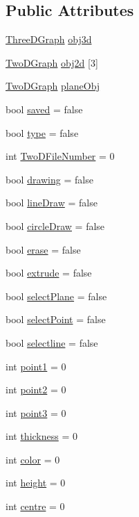 \subsection*{Public Attributes}
\begin{DoxyCompactItemize}
\item 
\hyperlink{classThreeDGraph}{Three\+D\+Graph} \hyperlink{classInteractive__editor_a2620ec3a4c9f18e9cd873e2a90c1167d}{obj3d}
\item 
\hyperlink{classTwoDGraph}{Two\+D\+Graph} \hyperlink{classInteractive__editor_a61dd4318434d640cc5191e038b66a407}{obj2d} \mbox{[}3\mbox{]}
\item 
\hyperlink{classTwoDGraph}{Two\+D\+Graph} \hyperlink{classInteractive__editor_aed0bc7a1d2cafae39f3fbf2eb119649c}{plane\+Obj}
\item 
bool \hyperlink{classInteractive__editor_a2e6cd28cc09c6250bb5aa720acfc16a4}{saved} = false
\item 
bool \hyperlink{classInteractive__editor_a93c2f2041e432c8047d51942345cc3f9}{type} = false
\item 
int \hyperlink{classInteractive__editor_a016e5e8e9a124977ab6048c90980be97}{Two\+D\+File\+Number} = 0
\item 
bool \hyperlink{classInteractive__editor_ace62b483a0866c64212ee0c641445c7a}{drawing} = false
\item 
bool \hyperlink{classInteractive__editor_aa0de8abac09ce2259252fba6c1958e83}{line\+Draw} = false
\item 
bool \hyperlink{classInteractive__editor_a1d7855fd44f17fb78dbb86e8b7962758}{circle\+Draw} = false
\item 
bool \hyperlink{classInteractive__editor_ac2f2f1dfb6c21585d4ed5ed043e41b25}{erase} = false
\item 
bool \hyperlink{classInteractive__editor_a3e4db48e715e92969ba3ec52ab14ce8d}{extrude} = false
\item 
bool \hyperlink{classInteractive__editor_a9da61abe038ee33f9d15ef4a028dc8ab}{select\+Plane} = false
\item 
bool \hyperlink{classInteractive__editor_ab0f07759c3ff1bcfe45d0c285abe29b5}{select\+Point} = false
\item 
bool \hyperlink{classInteractive__editor_ad2e77097ff1ba602c3cdca2905febea7}{selectline} = false
\item 
int \hyperlink{classInteractive__editor_a07fe2897bcad8eabf5b98e01a162b2a1}{point1} = 0
\item 
int \hyperlink{classInteractive__editor_af60245cb328db4c6b1ca00f1512dfc75}{point2} = 0
\item 
int \hyperlink{classInteractive__editor_a9b368072fc0a220476d21079b4bcb739}{point3} = 0
\item 
int \hyperlink{classInteractive__editor_a65f9bb481055109e9d52e2a6bc2db58e}{thickness} = 0
\item 
int \hyperlink{classInteractive__editor_a8bb78acdc55bebbe34bc545eb720217c}{color} = 0
\item 
int \hyperlink{classInteractive__editor_aced5ec777fe62fb280f3668a1c59f9b7}{height} = 0
\item 
int \hyperlink{classInteractive__editor_acb67c8393df8fe6f6f938f0609f24050}{centre} = 0
\end{DoxyCompactItemize}


